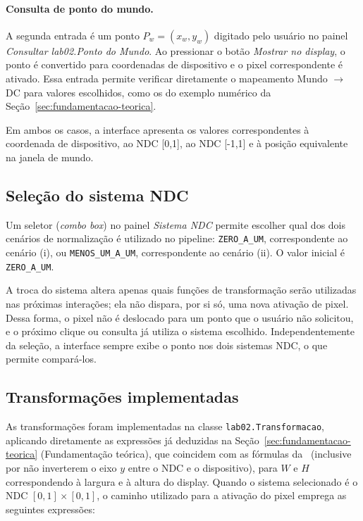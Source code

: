 \paragraph{Consulta de ponto do mundo.} A segunda entrada é um ponto $P_w = (x_w, y_w)$ digitado pelo usuário no painel \textit{Consultar lab02.Ponto do Mundo}. Ao pressionar o botão \textit{Mostrar no display}, o ponto é convertido para coordenadas de dispositivo e o pixel correspondente é ativado. Essa entrada permite verificar diretamente o mapeamento Mundo $\rightarrow$ DC para valores escolhidos, como os do exemplo numérico da Seção~\ref{sec:fundamentacao-teorica}.

Em ambos os casos, a interface apresenta os valores correspondentes à coordenada de dispositivo, ao NDC \mbox{[0,1]}, ao NDC \mbox{[-1,1]} e à posição equivalente na janela de mundo.

\subsection{Seleção do sistema NDC}
\label{subsec:selecao-ndc}
Um seletor (\textit{combo box}) no painel \textit{Sistema NDC} permite escolher qual dos dois cenários de normalização é utilizado no pipeline: \texttt{ZERO\_A\_UM}, correspondente ao cenário (i), ou \texttt{MENOS\_UM\_A\_UM}, correspondente ao cenário (ii). O valor inicial é \texttt{ZERO\_A\_UM}.

A troca do sistema altera apenas quais funções de transformação serão utilizadas nas próximas interações; ela não dispara, por si só, uma nova ativação de pixel. Dessa forma, o pixel não é deslocado para um ponto que o usuário não solicitou, e o próximo clique ou consulta já utiliza o sistema escolhido. Independentemente da seleção, a interface sempre exibe o ponto nos dois sistemas NDC, o que permite compará-los.

\subsection{Transformações implementadas}
As transformações foram implementadas na classe \texttt{lab02.Transformacao}, aplicando diretamente as expressões já deduzidas na Seção~\ref{sec:fundamentacao-teorica} (Fundamentação teórica), que coincidem com as fórmulas da \aularef\ (inclusive por não inverterem o eixo $y$ entre o NDC e o dispositivo), para $W$ e $H$ correspondendo à largura e à altura do display. Quando o sistema selecionado é o NDC \mbox{$[0,1] \times [0,1]$}, o caminho utilizado para a ativação do pixel emprega as seguintes expressões:

